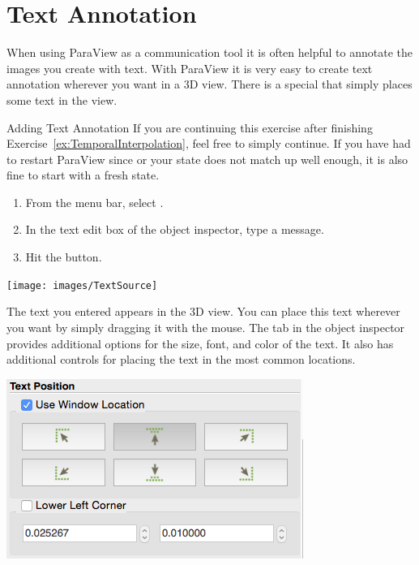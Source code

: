 \section{Text Annotation}



When using ParaView as a communication tool it is often helpful to annotate
the images you create with text.  With ParaView it is very easy to create
text annotation wherever you want in a 3D view.  There is a special
 that simply places some text in the view.

\begin{exercise}{Adding Text Annotation}
  \label{ex:AddingTextAnnotation}%
  If you are continuing this exercise after finishing
  Exercise~\ref{ex:TemporalInterpolation}, feel free to simply continue.
  If you have had to restart ParaView since or your state does not match up
  well enough, it is also fine to start with a fresh state.

  \begin{enumerate}
  \item From the menu bar, select  \ra {}.
  \item In the text edit box of the object inspector, type a message.
  \item Hit the \apply button.
  \end{enumerate}

  \begin{inlinefig}
    \texttt{[image: images/TextSource]}
  \end{inlinefig}

  The text you entered appears in the 3D view.  You can place this text
  wherever you want by simply dragging it with the mouse.  The
   tab in the object inspector provides additional options for
  the size, font, and color of the text.  It also has additional controls
  for placing the text in the most common locations.

  \begin{inlinefig}
    \includegraphics[width=.66\scw]{images/TextPosition}
  \end{inlinefig}
\end{exercise}


